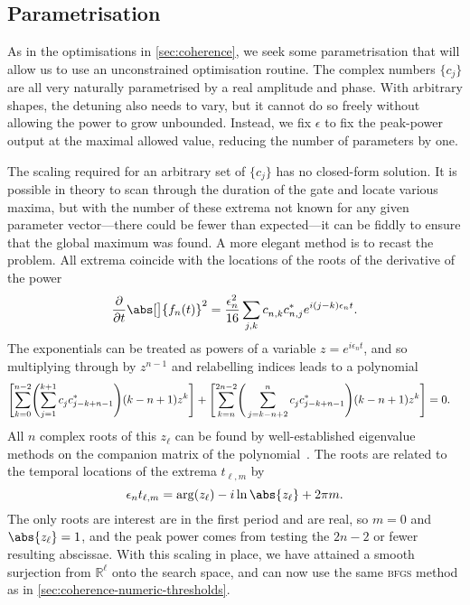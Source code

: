 \subsection{Parametrisation}

As in the optimisations in \cref{sec:coherence}, we seek some parametrisation that will allow us to use an unconstrained optimisation routine.
The complex numbers $\{c_j\}$ are all very naturally parametrised by a real amplitude and phase.
With arbitrary shapes, the detuning also needs to vary, but it cannot do so freely without allowing the power to grow unbounded.
Instead, we fix $\epsilon$ to fix the peak-power output at the maximal allowed value, reducing the number of parameters by one.

The scaling required for an arbitrary set of $\{c_j\}$ has no closed-form solution.
It is possible in theory to scan through the duration of the gate and locate various maxima, but with the number of these extrema not known for any given parameter vector---there could be fewer than expected---it can be fiddly to ensure that the global maximum was found.
A more elegant method is to recast the problem.
All extrema coincide with the locations of the roots of the derivative of the power
\begin{equation}
\frac\partial{\partial t}\abs[\big]{f_n(t)}^2 = \frac{\epsilon_n^2}{16}\sum_{j,k} c_{n,k\vphantom j}^{}c_{n,j\vphantom k}^*e^{i(j-k)\epsilon_n t}.
\end{equation}
The exponentials can be treated as powers of a variable $z = e^{i\epsilon_n t}$, and so multiplying through by $z^{n-1}$ and relabelling indices leads to a polynomial
\begin{equation}
\Biggl[\sum_{k=0}^{n-2}\Biggl(\sum_{j=1}^{k+1}c_{j\vphantom k}^{}c_{j-k+n-1}^*\Biggr)(k-n+1)z^k\Biggr]
+ \Biggl[\sum_{k=n}^{2n-2}\Biggl(\,\sum_{j=k-n+2}^{n}c_{j\vphantom k}^{}c_{j-k+n-1}^*\Biggr)(k-n+1)z^k\Biggr]
= 0.\quad %
\end{equation}
All $n$ complex roots of this $z_\ell$ can be found by well-established eigenvalue methods on the companion matrix of the polynomial~\cite{Press2007}.
The roots are related to the temporal locations of the extrema $t_{\ell,m}$ by
\begin{equation}
\epsilon_n t_{\ell,m} = \arg(z_\ell) - i\ln\abs{z_\ell} + 2\pi m.
\end{equation}
The only roots are interest are in the first period and are real, so $m=0$ and $\abs{z_\ell} = 1$, and the peak power comes from testing the $2n-2$ or fewer resulting abscissae.
With this scaling in place, we have attained a smooth surjection from $\mathbb R^\ell$ onto the search space, and can now use the same \textsc{bfgs} method as in \cref{sec:coherence-numeric-thresholds}.


